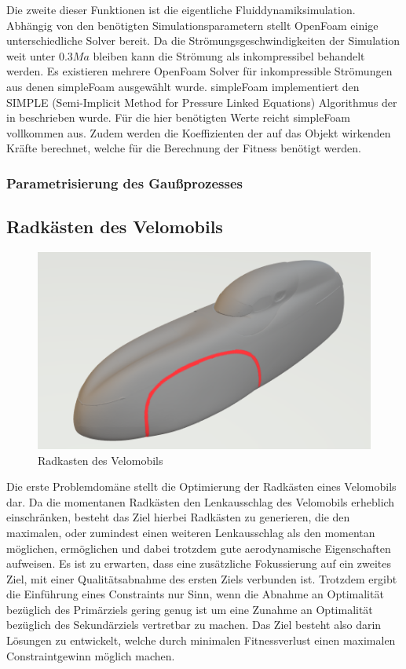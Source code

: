 Die zweite dieser Funktionen ist die eigentliche Fluiddynamiksimulation.
Abhängig von den benötigten Simulationsparametern stellt OpenFoam einige unterschiedliche Solver bereit.
Da die Strömungsgeschwindigkeiten der Simulation weit unter $0.3Ma$ bleiben kann die Strömung als inkompressibel behandelt werden.
Es existieren mehrere OpenFoam Solver für inkompressible Strömungen aus denen simpleFoam ausgewählt wurde.
simpleFoam implementiert den SIMPLE (Semi-Implicit Method for Pressure Linked Equations) Algorithmus der in \cite{Caretto.1973} beschrieben wurde.
Für die hier benötigten Werte reicht simpleFoam vollkommen aus.
Zudem werden die Koeffizienten der auf das Objekt wirkenden Kräfte berechnet, welche für die Berechnung der Fitness benötigt werden. 

\subsubsection{Parametrisierung des Gaußprozesses}



\subsection{Radkästen des Velomobils}
\label{sub:method_wheelcase}
\begin{figure}[h]
	\centering
	\includegraphics[width=.8\linewidth]{bilder/velo_wheelcase}
	\caption{Radkasten des Velomobils}
	\label{fig:wheelcase}
\end{figure}

Die erste Problemdomäne stellt die Optimierung der Radkästen eines Velomobils dar.
Da die momentanen Radkästen den Lenkausschlag des Velomobils erheblich einschränken, besteht das Ziel hierbei Radkästen zu generieren, die den maximalen, oder zumindest einen weiteren Lenkausschlag als den momentan möglichen, ermöglichen und dabei trotzdem gute aerodynamische Eigenschaften aufweisen.
Es ist zu erwarten, dass eine zusätzliche Fokussierung auf ein zweites Ziel, mit einer Qualitätsabnahme des ersten Ziels verbunden ist.
Trotzdem ergibt die Einführung eines Constraints nur Sinn, wenn die Abnahme an Optimalität bezüglich des Primärziels gering genug ist um eine Zunahme an Optimalität bezüglich des Sekundärziels vertretbar zu machen.
Das Ziel besteht also darin Lösungen zu entwickelt, welche durch minimalen Fitnessverlust einen maximalen Constraintgewinn möglich machen.

